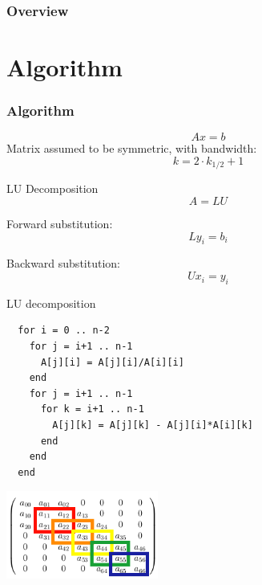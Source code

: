 \documentclass{beamer}
\begin{document}
\begin{frame}[fragile]
\frametitle{Overview}

 \tableofcontents[sectionstyle=show,subsectionstyle=show]
\end{frame}

\section{Algorithm}
\begin{frame}
\frametitle{Algorithm}
$$
Ax=b
$$
Matrix assumed to be symmetric, with bandwidth:
$$
k = 2 \cdot k_{1/2} + 1
$$

LU Decomposition
$$
A = LU
$$

Forward substitution:
$$
Ly_i = b_i
$$

Backward substitution:
$$
Ux_i = y_i
$$
\end{frame}
 \begin{frame}[fragile]{LU decomposition}

\begin{lstlisting}
  for i = 0 .. n-2
    for j = i+1 .. n-1
      A[j][i] = A[j][i]/A[i][i]
    end
    for j = i+1 .. n-1
      for k = i+1 .. n-1
        A[j][k] = A[j][k] - A[j][i]*A[i][k]
      end
    end
  end
\end{lstlisting}

\centerline{\includegraphics[width=5cm]{active_region_colored2.png}}

\end{frame}
\end{document}
